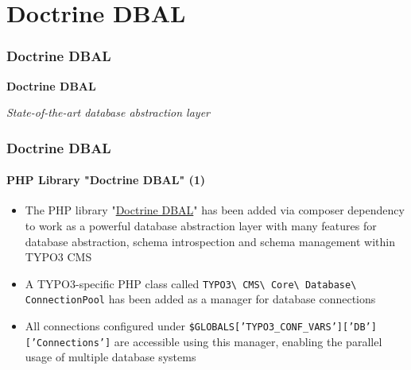 %

\section{Doctrine DBAL}
\begin{frame}[fragile]
	\frametitle{Doctrine DBAL}

	\begin{center}\huge{\color{typo3darkgrey}\textbf{Doctrine DBAL}}\end{center}
	\begin{center}\large{\textit{State-of-the-art database abstraction layer}}\end{center}

\end{frame}



\begin{frame}[fragile]
	\frametitle{Doctrine DBAL}
	\framesubtitle{PHP Library "Doctrine DBAL" (1)}

	\begin{itemize}

		\item The PHP library
			"\href{http://www.doctrine-project.org}{Doctrine DBAL}"
			has been added via composer dependency
			to work as a powerful database abstraction layer with many features for
			database abstraction, schema introspection and schema management within
			TYPO3 CMS

		\item A TYPO3-specific PHP class called
			\texttt{TYPO3\textbackslash
				CMS\textbackslash
				Core\textbackslash
				Database\textbackslash
				ConnectionPool}\newline
			has been added as a manager for database connections

		\item All connections configured under
			\texttt{\$GLOBALS['TYPO3\_CONF\_VARS']['DB']['Connections']}\newline
			are accessible using this manager, enabling the parallel usage of
			multiple database systems

	\end{itemize}

\end{frame}

